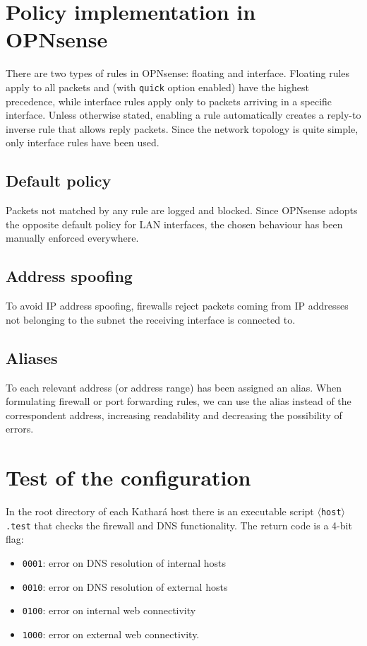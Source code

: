 \documentclass[draft]{homework}
\newcommand{\kat}{Kathará\xspace}
\newcommand{\opn}{OPNsense\xspace}
\begin{document}
    
    \section{Policy implementation in \opn}
    There are two types of rules in \opn: floating and interface.
    Floating rules apply to all packets and (with \texttt{quick} option enabled) have the highest precedence, while interface rules apply only to packets arriving in a specific interface.
    Unless otherwise stated, enabling a rule automatically creates a reply-to inverse rule that allows reply packets.
    Since the network topology is quite simple, only interface rules have been used.
    
    \subsection{Default policy}
    Packets not matched by any rule are logged and blocked.
    Since \opn adopts the opposite default policy for LAN interfaces, the chosen behaviour has been manually enforced everywhere.
    
    \subsection{Address spoofing}
    To avoid IP address spoofing, firewalls reject packets coming from IP addresses not belonging to the subnet the receiving interface is connected to.
    
    \subsection{Aliases}
    To each relevant address (or address range) has been assigned an alias.
    When formulating firewall or port forwarding rules, we can use the alias instead of the correspondent address, increasing readability and decreasing the possibility of errors.
    
    
    \section{Test of the configuration}
    In the root directory of each \kat  host there is an executable script \texttt{$\langle$host$\rangle$.test} that checks the firewall and DNS functionality.
    The return code is a 4-bit flag:
    \begin{itemize}
        \item \texttt{0001}: error on DNS resolution of internal hosts
        \item \texttt{0010}: error on DNS resolution of external hosts
        \item \texttt{0100}: error on internal web connectivity
        \item \texttt{1000}: error on external web connectivity.
    \end{itemize}
    
\end{document}
